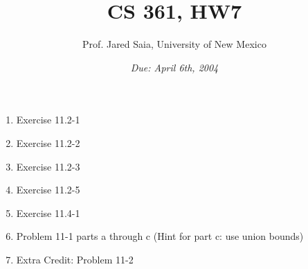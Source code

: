 \documentclass[11pt]{article}
\begin{document}
\title{CS 361, HW7}

\author {Prof. Jared Saia, University of New Mexico}

\date{\emph{Due: April 6th, 2004}}
\maketitle

\begin{enumerate}
\item Exercise 11.2-1
\item Exercise 11.2-2
\item Exercise 11.2-3
\item Exercise 11.2-5
\item Exercise 11.4-1
\item Problem 11-1 parts a through c (Hint for part c: use union
bounds)
\item Extra Credit: Problem 11-2
\end{enumerate}
\end{document}
